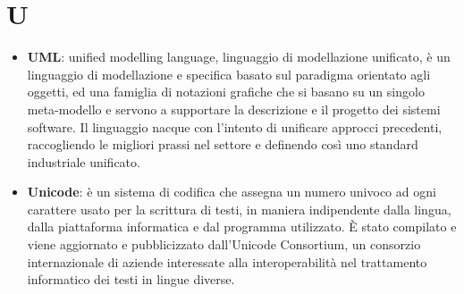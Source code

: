 \section{U}
\begin{itemize} 
	\item
	\textbf{UML}: unified modelling language, linguaggio di modellazione unificato, è un linguaggio di modellazione e specifica basato sul paradigma orientato agli oggetti, ed una famiglia di notazioni grafiche che si basano su un singolo meta-modello e servono a supportare la descrizione e il progetto dei sistemi software. Il linguaggio nacque con l'intento di unificare approcci precedenti, raccogliendo le migliori prassi nel settore e definendo così uno standard industriale unificato.
	\item
	\textbf{Unicode}:  è un sistema di codifica che assegna un numero univoco ad ogni carattere usato per la scrittura di testi, in maniera indipendente dalla lingua, dalla piattaforma informatica e dal programma utilizzato.
	È stato compilato e viene aggiornato e pubblicizzato dall'Unicode Consortium, un consorzio internazionale di aziende interessate alla interoperabilità nel trattamento informatico dei testi in lingue diverse.
\end{itemize}